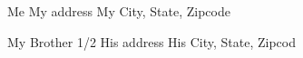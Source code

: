 \documentclass[a4paper,12pt]{article}
\begin{document}
\begin{labels}%
\vspace{-1ex}Me
My address
My City, State, Zipcode

My Brother
1/2
His address
His City, State, Zipcod
\end{labels}
\end{document}
